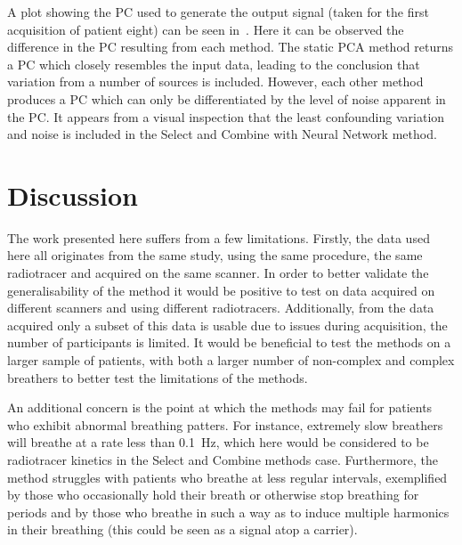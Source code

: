     A plot showing the \gls{PC} used to generate the output signal (taken for the first acquisition of patient eight) can be seen in~. Here it can be observed the difference in the \gls{PC} resulting from each method. The static \gls{PCA} method returns a \gls{PC} which closely resembles the input data, leading to the conclusion that variation from a number of sources is included. However, each other method produces a \gls{PC} which can only be differentiated by the level of noise apparent in the \gls{PC}. It appears from a visual inspection that the least confounding variation and noise is included in the Select and Combine with Neural Network method.

    
\section{Discussion} \label{sec:discussion}
    The work presented here suffers from a few limitations. Firstly, the data used here all originates from the same study, using the same procedure, the same radiotracer and acquired on the same scanner. In order to better validate the generalisability of the method it would be positive to test on data acquired on different scanners and using different radiotracers. Additionally, from the data acquired only a subset of this data is usable due to issues during acquisition, the number of participants is limited. It would be beneficial to test the methods on a larger sample of patients, with both a larger number of non-complex and complex breathers to better test the limitations of the methods.
    
    An additional concern is the point at which the methods may fail for patients who exhibit abnormal breathing patters. For instance, extremely slow breathers will breathe at a rate less than \SI{0.1}{\hertz}, which here would be considered to be radiotracer kinetics in the Select and Combine methods case. Furthermore, the method struggles with patients who breathe at less regular intervals, exemplified by those who occasionally hold their breath or otherwise stop breathing for periods and by those who breathe in such a way as to induce multiple harmonics in their breathing (this could be seen as a signal atop a carrier).


